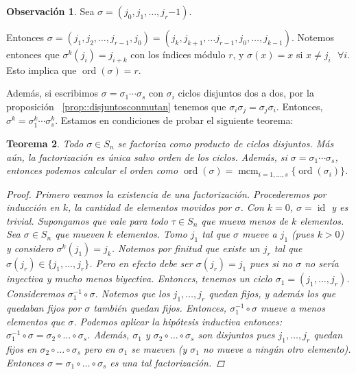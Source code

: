 \documentclass[12pt]{book}
\newtheorem{teo}{Teorema}[section]
\theoremstyle{definition}
\newtheorem{obs}[teo]{Observación}
\DeclareMathOperator{\id}{id}
\DeclareMathOperator{\mcm}{mcm}
\DeclareMathOperator{\ord}{ord}
\begin{document}
\begin{obs}
Sea $\sigma = (j_0, j_1 , \ldots , j_r{-1})$. 

Entonces $\sigma = (j_1, j_2, \ldots , j_{r-1},j_0) = (j_k, j_{k+1}, \ldots j_{r-1},j_0,\ldots , j_{k-1})$. Notemos entonces que $\sigma^{k}(j_i) = j_{i+k}$ con los índices módulo $r$, y $\sigma(x)=x$ si $x\neq j_i \text{ }\forall i$. Esto implica que $\ord(\sigma)=r$.

Además, si escribimos $\sigma = \sigma_1\cdots \sigma_s$ con $\sigma_i$ ciclos disjuntos dos a dos, por la proposición ~\ref{prop::disjuntosconmutan} tenemos que $\sigma_i \sigma_j = \sigma_j \sigma_i$. Entonces, $\sigma^k = \sigma_1^k \cdots \sigma_s^k$. Estamos en condiciones de probar el siguiente teorema:
\end{obs}

\begin{teo}
Todo $\sigma\in S_n$ se factoriza como producto de ciclos disjuntos. Más aún, la factorización es única salvo orden de los ciclos. Además, si $\sigma = \sigma_1\cdots \sigma_s$, entonces podemos calcular el orden como $\ord(\sigma) = \displaystyle\mcm_{i=1,\ldots , s} \{\ord(\sigma_i)\}$.

\begin{proof}
Primero veamos la existencia de una factorización. Procederemos por inducción en $k$, la cantidad de elementos movidos por $\sigma$. Con $k=0$, $\sigma = \id$ y es trivial. Supongamos que vale para todo $\tau\in S_n$ que mueva menos de $k$ elementos. Sea $\sigma\in S_n$ que mueven $k$ elementos. Tomo $j_1$ tal que $\sigma$ mueve a $j_1$ (pues $k>0$) y considero $\sigma^k (j_1) = j_k$. Notemos por finitud que existe un $j_r$ tal que $\sigma (j_r) \in \{j_1,\ldots , j_r\}$. Pero en efecto debe ser $\sigma (j_r)=j_1$ pues si no $\sigma$ no sería inyectiva y mucho menos biyectiva. Entonces, tenemos un ciclo $\sigma_1 = (j_1, \ldots , j_r)$. Consideremos $\sigma_{1}^{-1}\circ \sigma$. Notemos que los $j_1, \ldots , j_r$ quedan fijos, y además los que quedaban fijos por $\sigma$ también quedan fijos. Entonces, $\sigma_1^{-1}\circ \sigma$ mueve a menos elementos que $\sigma$. Podemos aplicar la hipótesis inductiva entonces: $\sigma_{1}^{-1}\circ \sigma = \sigma_2 \circ \ldots \circ \sigma_s$. Además, $\sigma_1$ y $\sigma_2\circ\ldots\circ\sigma_s$ son disjuntos pues $j_1,\ldots ,j_r$ quedan fijos en $\sigma_2\circ\ldots\circ\sigma_s$ pero en $\sigma_1$ se mueven (y $\sigma_1$ no mueve a ningún otro elemento). Entonces $\sigma = \sigma_1\circ\ldots\circ \sigma_s$ es una tal factorización.


\end{proof}
\end{teo}
\end{document}
